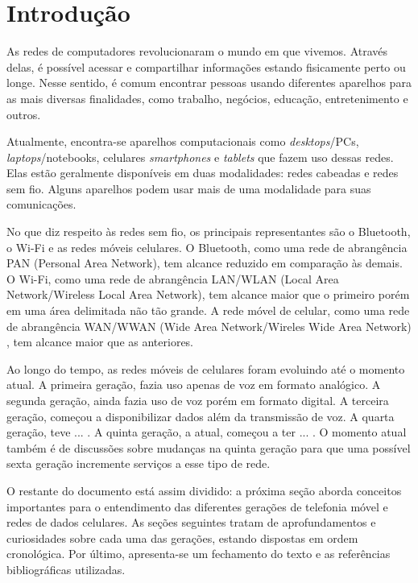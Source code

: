 \documentclass[11pt,oneside,a4paper]{abntex2}
\begin{document}


\maketitle

\section*{Introdução}
\label{intro}

As redes de computadores revolucionaram o mundo em que vivemos. Através delas, é possível acessar e compartilhar informações estando fisicamente perto ou longe. Nesse sentido, é comum encontrar pessoas usando diferentes aparelhos para as mais diversas finalidades, como trabalho, negócios, educação, entretenimento e outros.

Atualmente, encontra-se aparelhos computacionais como \textit{desktops}/PCs, \textit{laptops}/notebooks, celulares \textit{smartphones} e \textit{tablets} que fazem uso dessas redes. Elas estão geralmente disponíveis em duas modalidades: redes cabeadas e redes sem fio. Alguns aparelhos podem usar mais de uma modalidade para suas comunicações.

No que diz respeito às redes sem fio, os principais representantes são o Bluetooth, o Wi-Fi e as redes móveis celulares. O Bluetooth, como uma rede de abrangência PAN (Personal Area Network), tem alcance reduzido em comparação às demais. O Wi-Fi, como uma rede de abrangência LAN/WLAN (Local Area Network/Wireless Local Area Network), tem alcance maior que o primeiro porém em uma área delimitada não tão grande. A rede móvel de celular, como uma rede de abrangência WAN/WWAN (Wide Area Network/Wireles Wide Area Network) \cite{wwan}, tem alcance maior que as anteriores.

Ao longo do tempo, as redes móveis de celulares foram evoluindo até o momento atual. A primeira geração, fazia uso apenas de voz em formato analógico. A segunda geração, ainda fazia uso de voz porém em formato digital. A terceira geração, começou a disponibilizar dados além da transmissão de voz. A quarta geração, teve ... . A quinta geração, a atual, começou a ter ... . O momento atual também é de discussões sobre mudanças na quinta geração para que uma possível sexta geração incremente serviços a esse tipo de rede.

O restante do documento está assim dividido: a próxima seção aborda conceitos importantes para o entendimento das diferentes gerações de telefonia móvel e redes de dados celulares. As seções seguintes tratam de aprofundamentos e curiosidades sobre cada uma das gerações, estando dispostas em ordem cronológica. Por último, apresenta-se um fechamento do texto e as referências bibliográficas utilizadas.
\end{document}

